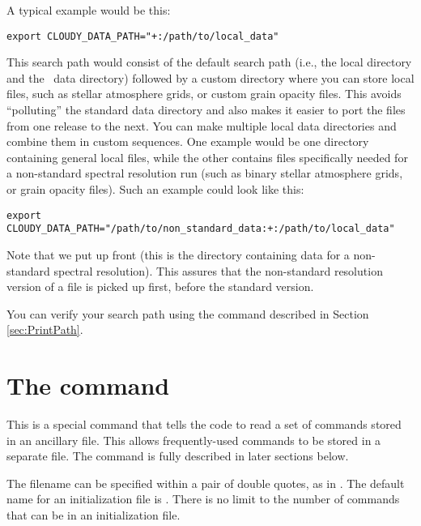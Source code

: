 A typical example would be this:
\begin{verbatim}
export CLOUDY_DATA_PATH="+:/path/to/local_data"
\end{verbatim}
This search path would consist of the default search path (i.e., the local
directory and the \Cloudy\ data directory) followed by a custom directory
 where you can store local files, such as
stellar atmosphere grids, or custom grain opacity files. This avoids
``polluting'' the standard data directory and also makes it easier to port the
files from one release to the next. You can make multiple local data
directories and combine them in custom sequences. One example would be one
directory containing general local files, while the other contains files
specifically needed for a non-standard spectral resolution run (such as binary
stellar atmosphere grids, or grain opacity files). Such an example could look
like this:
\begin{verbatim}
export CLOUDY_DATA_PATH="/path/to/non_standard_data:+:/path/to/local_data"
\end{verbatim}
Note that we put  up front (this is
the directory containing data for a non-standard spectral resolution). This
assures that the non-standard resolution version of a file is picked up first,
before the standard version.

You can verify your search path using the  command
described in Section \ref{sec:PrintPath}.

\section{The  command}

\noindent
This is a special command that tells the code to read a set of commands
stored in an ancillary file.  This allows frequently-used commands to be
stored in a separate file.
The  command is fully described in later sections below.

The filename can be specified within a pair of double quotes, as in
.
The default name for an initialization file is
.
There is no limit to the number of commands that can be in an
initialization file.

